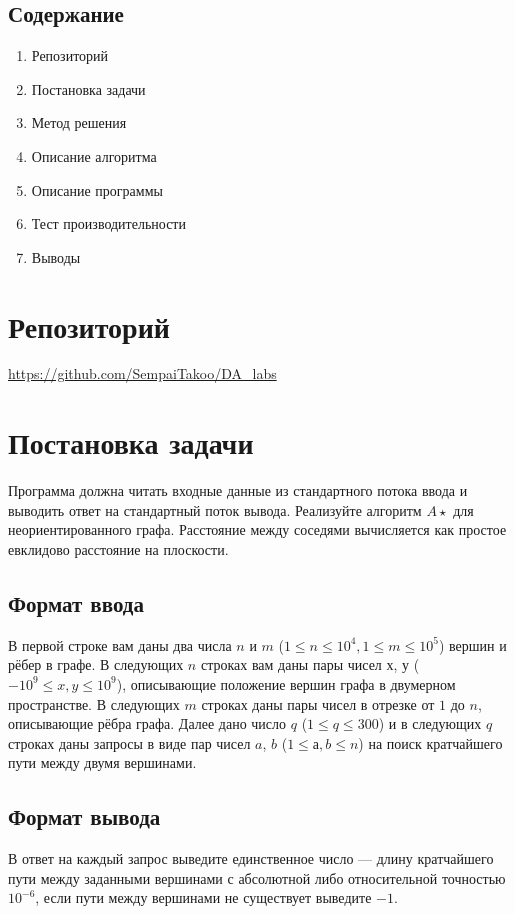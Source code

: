 \documentclass[12pt]{article}
\begin{document}
\begin{center}
\section*{Содержание}
\end{center}
\vspace{5ex}
\begin{enumerate}
  \item Репозиторий
  \item Постановка задачи
  \item Метод решения
  \item Описание алгоритма
  \item Описание программы
  \item Тест производительности
  \item Выводы
\end{enumerate}
\newpage


\section*{Репозиторий}
\vspace{2ex}
\url{https://github.com/SempaiTakoo/DA_labs}

\section*{Постановка задачи}

Программа должна читать входные данные из стандартного потока ввода и выводить ответ на стандартный поток вывода. Реализуйте алгоритм $A\star$ для неориентированного графа.
Расстояние между соседями вычисляется как простое евклидово расстояние на плоскости.

\subsection*{Формат ввода}
В первой строке вам даны два числа $n$ и $m$ ($1 \leq n \leq 10^4, 1 \leq m \leq 10^5$) вершин и рёбер в графе. В следующих $n$ строках вам даны пары чисел $х$, $у$ ($-10^9 \leq x, y \leq 10^9$), описывающие положение вершин графа в двумерном пространстве. В следующих $m$ строках даны пары чисел в отрезке от $1$ до $n$, описывающие рёбра графа. Далее дано число $q$ ($1 \leq q \leq 300$) и в следующих $q$ строках даны запросы в виде пар чисел $a$, $b$ ($1 \leq а, b \leq n$) на поиск кратчайшего пути между двумя вершинами.

\subsection*{Формат вывода}
В ответ на каждый запрос выведите единственное число — длину кратчайшего пути между заданными вершинами с абсолютной либо относительной точностью $10^{-6}$, если пути между вершинами не существует выведите $-1$.
\end{document}
